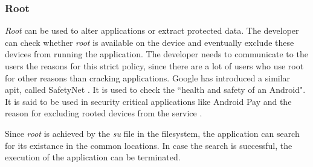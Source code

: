 \subsubsection{Root} \label{subsection:counter-improve-tampering-root}
\textit{Root} can be used to alter applications or extract protected data.
The developer can check whether \textit{root} is available on the device and eventually exclude these devices from running the application.
The developer needs to communicate to the users the reasons for this strict policy, since there are a lot of users who use root for other reasons than cracking applications.
\newline
Google has introduced a similar \gls{api}t, called SafetyNet \cite{safetynetGoogle}.
It is used to check the “health and safety of an Android"\cite{safetynetDev}.
It is said to be used in security critical applications like Android Pay and the reason for excluding rooted devices from the service \cite{safetynetGoogle} \cite{safetynetPay} \cite{safetynetPayx}.
\newline

Since \textit{root} is achieved by the \textit{su} file in the filesystem, the application can search for its existance in the common locations.
In case the search is successful, the execution of the application can be terminated.
